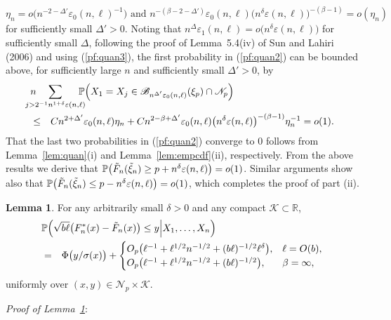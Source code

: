 \documentclass[a4paper, 12pt]{article}
\theoremstyle{plain}
\theoremstyle{definition}
\newcommand{\prob}{{\Bbb P}}
\newtheorem{lem}[thm]{Lemma}
\begin{document}
\begin{equation}
\eta_n=o\big(n^{-2-\Delta'}\varepsilon_0(n,\ell)^{-1}\big)\mbox{\ \ and\ \ }
n^{-(\beta-2-\Delta')}\varepsilon_0(n,\ell)
\big(n^\delta\varepsilon(n,\ell)\big)^{-
(\beta-1)}=o(\eta_n)
\label{pf:quan3}
\end{equation}
for sufficiently small $\Delta'>0$.
Noting that $n^\Delta\varepsilon_1(n,\ell)=o\big(n^\delta\varepsilon(n,\ell)\big)$
for sufficiently small $\Delta$, following the proof of Lemma~5.4(iv) of Sun and Lahiri (2006)
and using (\ref{pf:quan3}),
the first probability  in (\ref{pf:quan2})
can be bounded above, for sufficiently large $n$ and sufficiently small $\Delta'>0$, by
\begin{eqnarray}
\lefteqn{n\hspace{-3ex}\sum_{j>2^{-1}n^{1+\delta}\varepsilon(n,\ell)}
\hspace{-2ex}\prob\Big(X_1=X_j\in\mathscr{B}_{n^{\Delta'}\varepsilon_0(n,\ell)}(\xi_p)
\cap\mathscr{N}_p\Big)}\nonumber\\
&\le&Cn^{2+\Delta'}\varepsilon_0(n,\ell)\eta_n+Cn^{2-\beta+\Delta'}\varepsilon_0(n,\ell)
\big(n^{\delta}\varepsilon(n,\ell)\big)^{-(\beta-1)}\eta_n^{-1}=o(1).
\nonumber
\end{eqnarray}
That the last two probabilities in (\ref{pf:quan2})
converge to 0 follows
from Lemma~\ref{lem:quan}(i) and Lemma~\ref{lem:empcdf}(ii), respectively.
From the above results we derive that $\prob\big(\tilde{F}_n(\tilde\xi_n)\ge p+n^\delta\varepsilon(n,\ell)\big)=o(1)$.
Similar arguments show also that $\prob\big(\tilde{F}_n(\tilde\xi_n)\le p-n^\delta\varepsilon(n,\ell)\big)=o(1)$, which
completes the proof of part (ii).

\begin{lem}
\label{lem:bootcdf}
For any arbitrarily small $\delta>0$ and any compact $\mathscr{K}\subset\mathbb{R}$,
\begin{eqnarray*}
\lefteqn{\prob\Big(\sqrt{b\ell}\big(F^*_n(x)-\tilde{F}_n(x)\big)\le y\Big|X_1,\ldots,X_n\Big)}\\
&=&\Phi\big(y/\sigma(x)\big)
+
\begin{cases}
O_p\big(\ell^{-1}+\ell^{1/2}n^{-1/2}+(b\ell)^{-1/2}\ell^\delta\big),&
\ell=O(b),\\
O_p\big(\ell^{-1}+\ell^{1/2}n^{-1/2}+(b\ell)^{-1/2}\big),&
\beta=\infty,
\end{cases}
\end{eqnarray*}
uniformly over $(x,y)\in\mathscr{N}_p\times\mathscr{K}$.
\end{lem}
{\it Proof of Lemma~\ref{lem:bootcdf}\/}:
\end{document}

